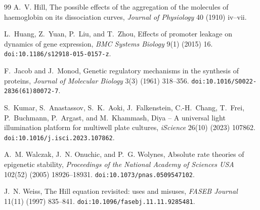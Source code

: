 \documentclass[12pt]{article}
\begin{document}
\begin{thebibliography}{99}
A.~V. Hill,
\newblock The possible effects of the aggregation of the molecules of haemoglobin
  on its dissociation curves,
\newblock \emph{Journal of Physiology} 40 (1910) iv--vii.

L.~Huang, Z.~Yuan, P.~Liu, and T.~Zhou,
\newblock Effects of promoter leakage on dynamics of gene expression,
\newblock \emph{BMC Systems Biology} 9(1) (2015) 16.
\newblock \texttt{doi:10.1186/s12918-015-0157-z}.

F.~Jacob and J.~Monod,
\newblock Genetic regulatory mechanisms in the synthesis of proteins,
\newblock \emph{Journal of Molecular Biology} 3(3) (1961) 318--356.
\newblock \texttt{doi:10.1016/S0022-2836(61)80072-7}.

S.~Kumar, S.~Anastassov, S.~K.~Aoki, J.~Falkenstein, C.-H.~Chang,
  T.~Frei, P.~Buchmann, P.~Argast, and M.~Khammash,
\newblock Diya -- A universal light illumination platform for multiwell plate
  cultures,
\newblock \emph{iScience} 26(10) (2023) 107862.
\newblock \texttt{doi:10.1016/j.isci.2023.107862}.

A.~M. Walczak, J.~N. Onuchic, and P.~G. Wolynes,
\newblock Absolute rate theories of epigenetic stability,
\newblock \emph{Proceedings of the National Academy of Sciences USA} 102(52)
  (2005) 18926--18931.
\newblock \texttt{doi:10.1073/pnas.0509547102}.

J.~N. Weiss,
\newblock The {H}ill equation revisited: uses and misuses,
\newblock \emph{FASEB Journal} 11(11) (1997) 835--841.
\newblock \texttt{doi:10.1096/fasebj.11.11.9285481}.

\end{thebibliography}
\end{document}
